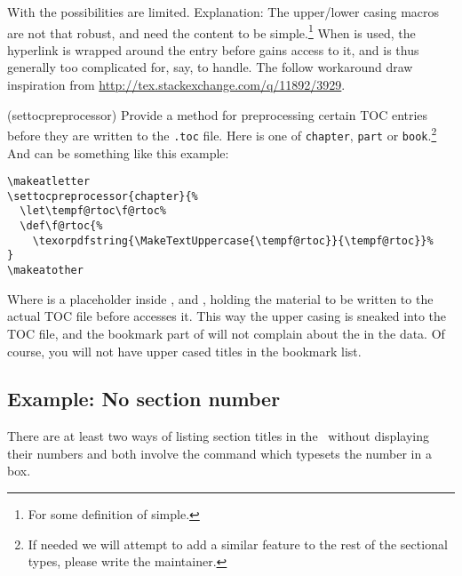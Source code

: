With  the possibilities are limited. Explanation: The
upper/lower casing macros are not that robust, and need the content to
be simple.\footnote{For some definition of simple.} When
 is used, the hyperlink is wrapped around the entry
before  gains access to it, and is thus generally too
complicated for, say,  to handle. The follow
workaround draw inspiration from
\url{http://tex.stackexchange.com/q/11892/3929}.
\begin{syntax}
  \cmd{\settocpreprocessor}
\end{syntax}
\glossary(settocpreprocessor)%
  {}
  {Provide a method for preprocessing certain TOC entries before they
    are written to the \texttt{.toc} file.}
Here  is one of \texttt{chapter}, \texttt{part} or
\texttt{book}.\footnote{If needed we will attempt to add a similar
  feature to the rest of the sectional types, please write the
  maintainer.} And  can be something like this example:
\begin{verbatim}
\makeatletter
\settocpreprocessor{chapter}{%
  \let\tempf@rtoc\f@rtoc%
  \def\f@rtoc{%
    \texorpdfstring{\MakeTextUppercase{\tempf@rtoc}}{\tempf@rtoc}}%
}
\makeatother
\end{verbatim}
Where  is a placeholder inside \cmd{\chapter}, \cmd{\part}
and \cmd{\book}, holding the material to be written to the actual TOC
file before  accesses it. This way the upper casing is
sneaked into the TOC file, and the bookmark part of 
will not complain about the \cmd{\MakeTextUppercase} in the data. Of
course, you will not have upper cased titles in the bookmark list.







\subsection{Example: No section number}

    There are at least two ways of listing section titles in the \toc\
without displaying their numbers and both involve the \cmd{\numberline}
command which typesets the number in a box. 


